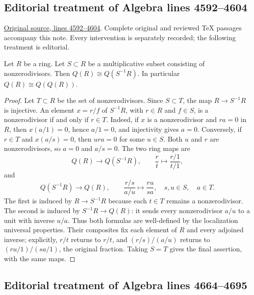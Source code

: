 \subsection{Editorial treatment of Algebra lines 4592--4604}

\hypertarget{algebra-context-023}{}

\noindent\href{https://github.com/stacks/stacks-project/blob/a04446e57ec1fbc252a871afcec7752fb2807b14/algebra.tex\#L4592}{Original source, lines 4592--4604}. Complete original and reviewed TeX passages accompany this note. Every intervention is separately recorded; the following treatment is editorial.


\begin{lemma}
\label{editorial-source-lemma-total-ring-fractions}
Let $R$ be a ring.
Let $S \subset R$ be a multiplicative subset consisting of nonzerodivisors.
Then $Q(R) \cong Q(S^{-1}R)$.
In particular $Q(R) \cong Q(Q(R))$.
\end{lemma}

\begin{proof}
Let $T\subset R$ be the set of nonzerodivisors.
Since $S\subset T$, the map $R\to S^{-1}R$ is injective.
An element $x=r/f$ of $S^{-1}R$, with $r\in R$ and $f\in S$,
is a nonzerodivisor if and only if $r\in T$.
Indeed, if $x$ is a nonzerodivisor and $ra=0$ in $R$, then
$x(a/1)=0$, hence $a/1=0$, and injectivity gives $a=0$.
Conversely, if $r\in T$ and $x(a/s)=0$, then
$ura=0$ for some $u\in S$. Both $u$ and $r$ are nonzerodivisors,
so $a=0$ and $a/s=0$.
The two ring maps are
$$
Q(R)\longrightarrow Q(S^{-1}R),\qquad
\frac{r}{t}\longmapsto\frac{r/1}{t/1},
$$
and
$$
Q(S^{-1}R)\longrightarrow Q(R),\qquad
\frac{r/s}{a/u}\longmapsto\frac{ru}{sa},
\quad s,u\in S,\quad a\in T.
$$
The first is induced by $R\to S^{-1}R$ because each $t\in T$
remains a nonzerodivisor. The second is induced by $S^{-1}R\to Q(R)$:
it sends every nonzerodivisor $a/u$ to a unit with inverse $u/a$.
Thus both formulas are well-defined by the localization universal
properties. Their composites fix each element of $R$ and every
adjoined inverse; explicitly, $r/t$ returns to $r/t$, and
$(r/s)/(a/u)$ returns to $(ru/1)/(sa/1)$, the original fraction.
Taking $S=T$ gives the final assertion, with the same maps.
\end{proof}


\subsection{Editorial treatment of Algebra lines 4664--4695}

